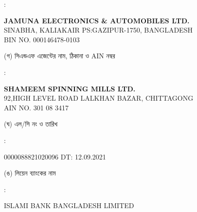 \documentclass[12pt]{article}
\newcommand{\lcno}{0000088821020096}
\newcommand{\lcdt}{12.09.2021}
\newcommand{\lienbank}{ISLAMI BANK BANGLADESH LIMITED}
\newcommand{\impn}{JAMUNA ELECTRONICS \& AUTOMOBILES LTD.}
\newcommand{\impadd}{SINABHA, KALIAKAIR
\newline
PS:GAZIPUR-1750, BANGLADESH}
\newcommand{\impbin}{000146478-0103}
\newcommand{\cnfn}{SHAMEEM SPINNING MILLS LTD.}
\newcommand{\cnfadd}{92,HIGH LEVEL ROAD
\newline
LALKHAN BAZAR, CHITTAGONG}
\newcommand{\cnfain}{301 08 3417}
\begin{document}
\begin{minipage}[t]{0.02\linewidth}
:
\end{minipage}
\begin{minipage}[t]{0.50\linewidth}
\textbf{{\impn}}
\\
{\impadd}
\\
BIN NO. {\impbin}
\\
\end{minipage}
\begin{minipage}[t]{0.05\linewidth}
\hspace*{1em}
\end{minipage}
\begin{minipage}[t]{0.45\linewidth}
(গ) সিএন্ডএফ এজেন্টের নাম, ঠিকানা
ও AIN নম্বর
\end{minipage}
\begin{minipage}[t]{0.02\linewidth}
:
\end{minipage}
\begin{minipage}[t]{0.50\linewidth}
\textbf{{\cnfn}}
\\
{\cnfadd}
\\
AIN NO. {\cnfain}
\\
\end{minipage}
\begin{minipage}[t]{0.05\linewidth}
\hspace*{1em}
\end{minipage}
\begin{minipage}[t]{0.45\linewidth}
(ঘ) এল/সি নং ও তারিখ
\end{minipage}
\begin{minipage}[t]{0.02\linewidth}
:
\end{minipage}
\begin{minipage}[t]{0.50\linewidth}
{\lcno} \hspace{2em} DT: {\lcdt}
\\
\end{minipage}
\begin{minipage}[t]{0.05\linewidth}
\hspace*{1em}
\end{minipage}
\begin{minipage}[t]{0.45\linewidth}
(ঙ) লিয়েন ব্যাংকের নাম
\end{minipage}
\begin{minipage}[t]{0.02\linewidth}
:
\end{minipage}
\begin{minipage}[t]{0.50\linewidth}
{\lienbank}
\\
\end{minipage}
\end{document}
